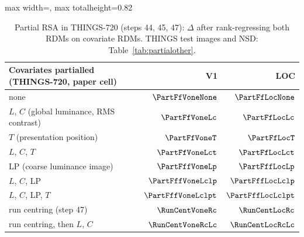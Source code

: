 \begin{table}[H]
\centering
\small
\begin{adjustbox}{max width=\textwidth, max totalheight=0.82\textheight}
\begin{tabular}{@{}lrr@{}}
\toprule
Covariates partialled (THINGS-720, paper cell) & V1 & LOC \\
\midrule
none & $\PartFfVoneNone$ & $\PartFfLocNone$ \\
$L$, $C$ (global luminance, RMS contrast) & $\PartFfVoneLc$ & $\PartFfLocLc$ \\
$T$ (presentation position) & $\PartFfVoneT$ & $\PartFfLocT$ \\
$L$, $C$, $T$ & $\PartFfVoneLct$ & $\PartFfLocLct$ \\
LP (coarse luminance image) & $\PartFffVoneLp$ & $\PartFffLocLp$ \\
$L$, $C$, LP & $\PartFffVoneLclp$ & $\PartFffLocLclp$ \\
$L$, $C$, LP, $T$ & $\PartFffVoneLclpt$ & $\PartFffLocLclpt$ \\
\midrule
run centring (step 47) & $\RunCentVoneRc$ & $\RunCentLocRc$ \\
run centring, then $L$, $C$ & $\RunCentVoneRcLc$ & $\RunCentLocRcLc$ \\
\bottomrule
\end{tabular}
\end{adjustbox}
\caption{Partial RSA in THINGS-720 (steps 44, 45, 47): $\Delta$ after rank-regressing both RDMs on covariate RDMs. THINGS test images and NSD: Table~\ref{tab:partialother}.}
\label{tab:partial}
\end{table}
